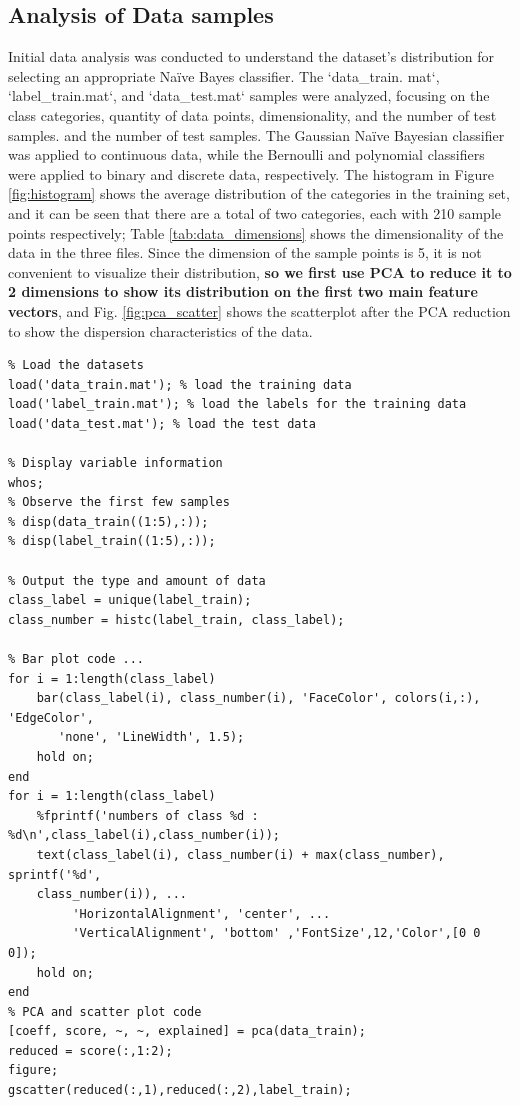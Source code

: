 \documentclass[12pt, onecolumn]{article}
\begin{document}
\subsection{Analysis of Data samples}
Initial data analysis was conducted to understand the dataset's distribution for selecting an appropriate Naïve Bayes classifier. The `data\_train. mat`, `label\_train.mat`, and `data\_test.mat` samples were analyzed, focusing on the class categories, quantity of data points, dimensionality, and the number of test samples. and the number of test samples. The Gaussian Naïve Bayesian classifier was applied to continuous data, while the Bernoulli and polynomial classifiers were applied to binary and discrete data, respectively. The histogram in Figure \ref{fig:histogram} shows the average distribution of the categories in the training set, and it can be seen that there are a total of two categories, each with 210 sample points respectively; Table \ref{tab:data_dimensions} shows the dimensionality of the data in the three files. Since the dimension of the sample points is 5, it is not convenient to visualize their distribution, \textbf{so we first use PCA to reduce it to 2 dimensions to show its distribution on the first two main feature vectors}, and Fig. \ref{fig:pca_scatter} shows the scatterplot after the PCA reduction to show the dispersion characteristics of the data.

\begin{verbatim}
% Load the datasets
load('data_train.mat'); % load the training data
load('label_train.mat'); % load the labels for the training data
load('data_test.mat'); % load the test data

% Display variable information
whos;
% Observe the first few samples
% disp(data_train((1:5),:));
% disp(label_train((1:5),:));

% Output the type and amount of data
class_label = unique(label_train);
class_number = histc(label_train, class_label);

% Bar plot code ...
for i = 1:length(class_label)
    bar(class_label(i), class_number(i), 'FaceColor', colors(i,:), 'EdgeColor', 
       'none', 'LineWidth', 1.5);
    hold on; 
end
for i = 1:length(class_label)
    %fprintf('numbers of class %d : %d\n',class_label(i),class_number(i));
    text(class_label(i), class_number(i) + max(class_number), sprintf('%d', 
    class_number(i)), ...
         'HorizontalAlignment', 'center', ...
         'VerticalAlignment', 'bottom' ,'FontSize',12,'Color',[0 0 0]);
    hold on;
end
% PCA and scatter plot code 
[coeff, score, ~, ~, explained] = pca(data_train);
reduced = score(:,1:2);
figure;
gscatter(reduced(:,1),reduced(:,2),label_train);
\end{verbatim}
\end{document}
